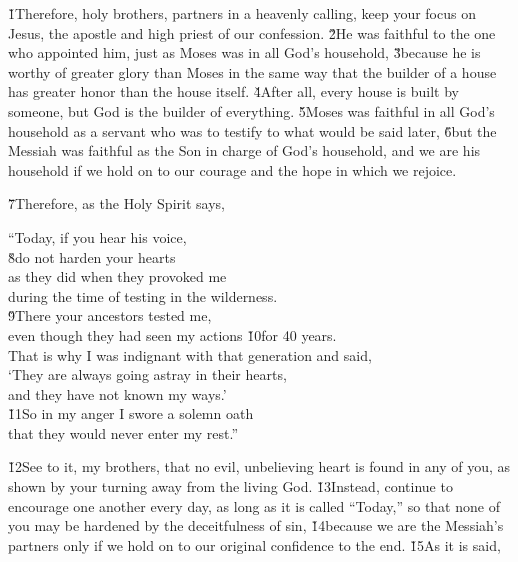 \v{1}Therefore, holy brothers, partners in a heavenly calling, keep your focus on Jesus, the apostle and high priest of our confession. \v{2}He was faithful to the one who appointed him, just as Moses was in all God's household, \v{3}because he is worthy of greater glory than Moses in the same way that the builder of a house has greater honor than the house itself. \v{4}After all, every house is built by someone, but God is the builder of everything. \v{5}Moses was faithful in all God's household as a servant who was to testify to what would be said later, \v{6}but the Messiah was faithful as the Son in charge of God's household, and we are his household if we hold on to our courage and the hope in which we rejoice.

\v{7}Therefore, as the Holy Spirit says,

\begin{poetry}
\poeml ``Today, if you hear his voice, \\
\poeml \v{8}do not harden your hearts \\
\poeml as they did when they provoked me \\
\poemll    during the time of testing in the wilderness. \\
\poeml \v{9}There your ancestors tested me, \\
\poemll    even though they had seen my actions \v{10}for 40 years. \\
\poeml That is why I was indignant with that generation and said, \\
\poemll    `They are always going astray in their hearts, \\
\poemlll       and they have not known my ways.' \\
\poeml \v{11}So in my anger I swore a solemn oath \\
\poemll    that they would never enter my rest.''
\end{poetry}

\v{12}See to it, my brothers, that no evil, unbelieving heart is found in any of you, as shown by your turning away from the living God. \v{13}Instead, continue to encourage one another every day, as long as it is called ``Today,'' so that none of you may be hardened by the deceitfulness of sin, \v{14}because we are the Messiah's partners only if we hold on to our original confidence to the end. \v{15}As it is said,

